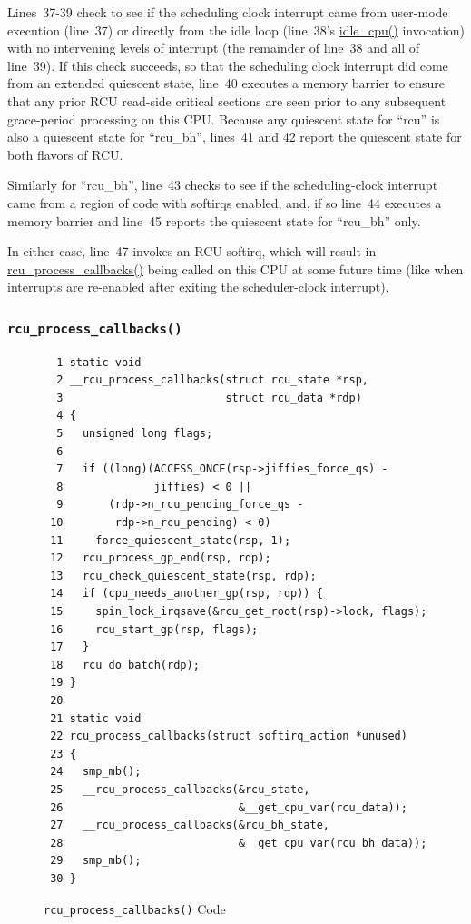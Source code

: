 Lines~37-39 check to see if the scheduling clock interrupt came
from user-mode execution (line~37) or directly from the idle
loop (line~38's \url{idle_cpu()} invocation) with no intervening
levels of interrupt (the remainder of line~38 and all of line~39).
If this check succeeds, so that the scheduling clock interrupt
did come from an extended quiescent state,
line~40 executes a memory barrier to ensure that any prior
RCU read-side critical sections are seen prior to any subsequent
grace-period processing on this CPU.
Because any quiescent state for ``rcu'' is also a quiescent state
for ``rcu\_bh'', lines~41 and 42 report the quiescent state for
both flavors of RCU.

Similarly for ``rcu\_bh'', line~43 checks to see if the scheduling-clock
interrupt came from a region of code with softirqs enabled, and, if so
line~44 executes a memory barrier and line~45 reports the quiescent
state for ``rcu\_bh'' only.

 \QuickQuizEnd

In either case, line~47 invokes an RCU softirq, which will result in
\url{rcu_process_callbacks()} being called on this CPU at some future
time (like when interrupts are re-enabled after exiting the
scheduler-clock interrupt).

\subsubsection{\tt rcu\_process\_callbacks()}
\label{app:rcuimpl:rcutreewt:rcu-process-callbacks}

\begin{figure}[tbp]
{ \scriptsize
\begin{verbatim}
  1 static void
  2 __rcu_process_callbacks(struct rcu_state *rsp,
  3                         struct rcu_data *rdp)
  4 {
  5   unsigned long flags;
  6 
  7   if ((long)(ACCESS_ONCE(rsp->jiffies_force_qs) -
  8              jiffies) < 0 ||
  9       (rdp->n_rcu_pending_force_qs -
 10        rdp->n_rcu_pending) < 0)
 11     force_quiescent_state(rsp, 1);
 12   rcu_process_gp_end(rsp, rdp);
 13   rcu_check_quiescent_state(rsp, rdp);
 14   if (cpu_needs_another_gp(rsp, rdp)) {
 15     spin_lock_irqsave(&rcu_get_root(rsp)->lock, flags);
 16     rcu_start_gp(rsp, flags);
 17   }
 18   rcu_do_batch(rdp);
 19 }
 20 
 21 static void
 22 rcu_process_callbacks(struct softirq_action *unused)
 23 {
 24   smp_mb();
 25   __rcu_process_callbacks(&rcu_state,
 26                           &__get_cpu_var(rcu_data));
 27   __rcu_process_callbacks(&rcu_bh_state,
 28                           &__get_cpu_var(rcu_bh_data));
 29   smp_mb();
 30 }
\end{verbatim}
}
\caption{{\tt rcu\_process\_callbacks()} Code}
\label{fig:app:rcuimpl:rcutreewt:Code for rcutree rcu-process-callbacks}
\end{figure}

